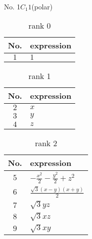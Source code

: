 \documentclass[fleqn,8pt,landscape]{jsarticle}
\begin{document}
\setcounter{MaxMatrixCols}{16}

\begin{center}
\LARGE
No. 1\quad$C_{1}$\quad$1$\quad[ triclinic ] (polar)
\end{center}
\begin{table}[ht!]
\begin{center}
\caption{rank 0}
\renewcommand{\arraystretch}{1.3}
\begin{tabular}{cl} \hline \hline
No. & expression \\ \hline
$ 1 $ & $ 1 $ \\
 \hline \hline
\end{tabular}
\end{center}
\end{table}
\begin{table}[ht!]
\begin{center}
\caption{rank 1}
\renewcommand{\arraystretch}{1.3}
\begin{tabular}{cl} \hline \hline
No. & expression \\ \hline
$ 2 $ & $ x $ \\
$ 3 $ & $ y $ \\
$ 4 $ & $ z $ \\
 \hline \hline
\end{tabular}
\end{center}
\end{table}
\begin{table}[ht!]
\begin{center}
\caption{rank 2}
\renewcommand{\arraystretch}{1.3}
\begin{tabular}{cl} \hline \hline
No. & expression \\ \hline
$ 5 $ & $ - \frac{x^{2}}{2} - \frac{y^{2}}{2} + z^{2} $ \\
$ 6 $ & $ \frac{\sqrt{3} \left(x - y\right) \left(x + y\right)}{2} $ \\
$ 7 $ & $ \sqrt{3} y z $ \\
$ 8 $ & $ \sqrt{3} x z $ \\
$ 9 $ & $ \sqrt{3} x y $ \\
 \hline \hline
\end{tabular}
\end{center}
\end{table}
\end{document}
